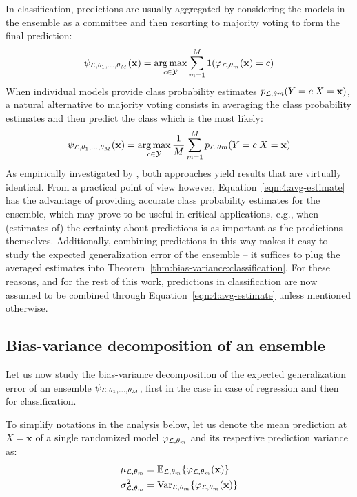 In classification, predictions are usually aggregated by considering the
models in the ensemble as a committee  and then resorting to majority voting to
form the final prediction:
\begin{equation}
\psi_{{\cal L},\theta_1,\dots,\theta_M}(\mathbf{x}) = \operatorname*{arg\,max}_{c \in {\cal Y}}  \sum_{m=1}^M 1(\varphi_{{\cal L},\theta_m}(\mathbf{x})=c)
\end{equation}
When individual models provide class probability estimates $p_{{\cal L},\theta m}(Y=c|X=\mathbf{x})$,
a natural alternative to majority voting consists in averaging the class probability estimates
and then predict the class which is the most likely:
\begin{equation}\label{eqn:4:avg-estimate}
\psi_{{\cal L},\theta_1,\dots,\theta_M}(\mathbf{x}) = \operatorname*{arg\,max}_{c \in {\cal Y}} \frac{1}{M} \sum_{m=1}^M p_{{\cal L},\theta m}(Y=c|X=\mathbf{x})
\end{equation}
As empirically investigated by \citet{breiman:1996b}, both approaches yield
results that are virtually identical. From a practical point of view however,
Equation~\ref{eqn:4:avg-estimate} has the advantage of providing accurate class
probability estimates for the ensemble, which may prove to be useful in
critical applications, e.g., when (estimates of) the certainty about
predictions is as important as the predictions themselves. Additionally,
combining predictions in this way makes it easy to study the expected
generalization error of the ensemble -- it suffices to plug the averaged
estimates into Theorem~\ref{thm:bias-variance:classification}. For these
reasons, and for the rest of this work, predictions in classification are now
assumed to be combined through Equation~\ref{eqn:4:avg-estimate} unless
mentioned otherwise.


\subsection{Bias-variance decomposition of an ensemble}
\label{sec:4:bias-variance:ensemble}

Let us now study the bias-variance decomposition of the expected generalization
error of an ensemble $\psi_{{\cal L},\theta_1,\dots,\theta_M}$, first in the
case in case of regression and then for classification.

To simplify notations in the analysis below, let us denote the mean prediction at
$X=\mathbf{x}$ of a single randomized model $\varphi_{{\cal L},\theta_m}$ and its
respective prediction variance as:
\begin{align}
\mu_{{\cal L},\theta_m} &= \mathbb{E}_{{\cal L},\theta_m} \{ \varphi_{{\cal L},\theta_m}(\mathbf{x}) \} \\
\sigma^2_{{\cal L},\theta_m} &= \text{Var}_{{\cal L},\theta_m} \{ \varphi_{{\cal L},\theta_m}(\mathbf{x}) \}
\end{align}

